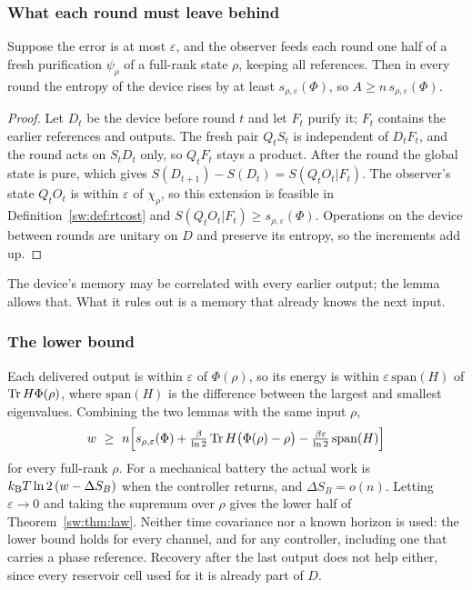 \subsubsection{What each round must leave behind}

\begin{lemma}\label{sw:lem:accumulation}
Suppose the error is at most $\varepsilon$, and the observer feeds each round one half of a fresh purification $\psi_\rho$ of a full-rank state $\rho$, keeping all references. Then in every round the entropy of the device rises by at least $s_{\rho,\varepsilon}(\Phi)$, so $A\ge n\,s_{\rho,\varepsilon}(\Phi)$.
\end{lemma}

\begin{proof}
Let $D_t$ be the device before round $t$ and let $F_t$ purify it; $F_t$ contains the earlier references and outputs. The fresh pair $Q_tS_t$ is independent of $D_tF_t$, and the round acts on $S_tD_t$ only, so $Q_tF_t$ stays a product. After the round the global state is pure, which gives $S(D_{t+1})-S(D_t)=S(Q_tO_t|F_t)$. The observer's state $Q_tO_t$ is within $\varepsilon$ of $\chi_\rho$, so this extension is feasible in Definition~\ref{sw:def:rtcost} and $S(Q_tO_t|F_t)\ge s_{\rho,\varepsilon}(\Phi)$. Operations on the device between rounds are unitary on $D$ and preserve its entropy, so the increments add up.
\end{proof}

The device's memory may be correlated with every earlier output; the lemma allows that. What it rules out is a memory that already knows the next input.

\subsubsection{The lower bound}

Each delivered output is within $\varepsilon$ of $\Phi(\rho)$, so its energy is within $\varepsilon\,\mathrm{span}(H)$ of $\operatorname{Tr} H\Phi(\rho)$, where $\mathrm{span}(H)$ is the difference between the largest and smallest eigenvalues. Combining the two lemmas with the same input $\rho$,
\begin{equation}\label{sw:eq:converse}
w\ \ge\ n\Bigl[s_{\rho,\varepsilon}(\Phi)+\tfrac{\beta}{\ln2}\operatorname{Tr} H\bigl(\Phi(\rho)-\rho\bigr)-\tfrac{\beta\varepsilon}{\ln2}\,\mathrm{span}(H)\Bigr]
\end{equation}
for every full-rank $\rho$. For a mechanical battery the actual work is $k_{\mathrm B} T\ln2\,(w-\Delta S_B)$ when the controller returns, and $\Delta S_B=o(n)$. Letting $\varepsilon\to0$ and taking the supremum over $\rho$ gives the lower half of Theorem~\ref{sw:thm:law}. Neither time covariance nor a known horizon is used: the lower bound holds for every channel, and for any controller, including one that carries a phase reference. Recovery after the last output does not help either, since every reservoir cell used for it is already part of $D$.

